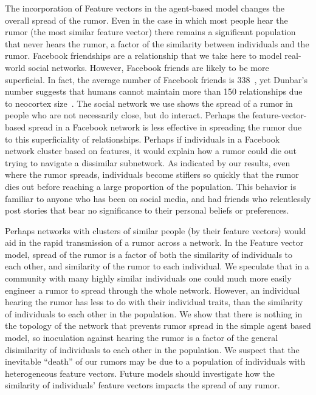 The incorporation of Feature vectors in the agent-based model changes the overall spread of the rumor.
Even in the case in which most people hear the rumor (the most similar feature vector) there remains a significant population that never hears the rumor, a factor of the similarity between individuals and the rumor.
Facebook friendships are a relationship that we take here to model real-world social networks.
However, Facebook friends are likely to be more superficial.
In fact, the average number of Facebook friends is 338~\cite{smith-2014}, yet Dunbar's number suggests that humans cannot maintain more than 150 relationships due to neocortex size~\cite{dunbar-1992}.
The social network we use shows the spread of a rumor in people who are not necessarily close, but do interact.
Perhaps the feature-vector-based spread in a Facebook network is less effective in spreading the rumor due to this superficiality of relationships.
Perhaps if individuals in a Facebook network cluster based on features, it would explain how a rumor could die out trying to navigate a dissimilar subnetwork.
As indicated by our results, even where the rumor spreads, individuals become stiflers so quickly that the rumor dies out before reaching a large proportion of the population.
This behavior is familiar to anyone who has been on social media, and had friends who relentlessly post stories that bear no significance to their personal beliefs or preferences.


Perhaps networks with clusters of similar people (by their feature vectors) would aid in the rapid transmission of a rumor across a network.
In the Feature vector model, spread of the rumor is a factor of both the similarity of individuals to each other, and similarity of the rumor to each individual.
We speculate that in a community with many highly similar individuals one could much more easily engineer a rumor to spread through the whole network.
However, an individual hearing the rumor has less to do with their individual traits, than the similarity of individuals to each other in the population.
We show that there is nothing in the topology of the network that prevents rumor spread in the simple agent based model, so inoculation against hearing the rumor is a factor of the general disimilarity of individuals to each other in the population.
We suspect that the inevitable ``death'' of our rumors may be due to a population of individuals with heterogeneous feature vectors.
Future models should investigate how the similarity of individuals' feature vectors impacts the spread of any rumor.


